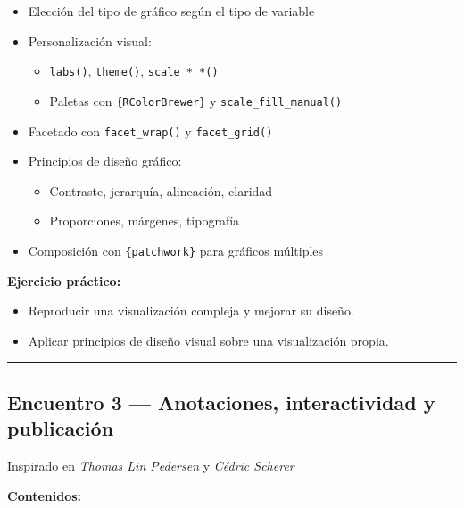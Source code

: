 \documentclass[
  11pt,
  letterpaper,
  DIV=11,
  numbers=noendperiod]{scrartcl}
\providecommand{\tightlist}{%
  \setlength{\itemsep}{0pt}\setlength{\parskip}{0pt}}\usepackage{longtable,booktabs,array}
\begin{document}
\begin{itemize}
\tightlist
\item
  Elección del tipo de gráfico según el tipo de variable
\item
  Personalización visual:

  \begin{itemize}
  \tightlist
  \item
    \texttt{labs()}, \texttt{theme()}, \texttt{scale\_*\_*()}
  \item
    Paletas con \texttt{\{RColorBrewer\}} y
    \texttt{scale\_fill\_manual()}
  \end{itemize}
\item
  Facetado con \texttt{facet\_wrap()} y \texttt{facet\_grid()}
\item
  Principios de diseño gráfico:

  \begin{itemize}
  \tightlist
  \item
    Contraste, jerarquía, alineación, claridad
  \item
    Proporciones, márgenes, tipografía
  \end{itemize}
\item
  Composición con \texttt{\{patchwork\}} para gráficos múltiples
\end{itemize}

\textbf{Ejercicio práctico:}

\begin{itemize}
\tightlist
\item
  Reproducir una visualización compleja y mejorar su diseño.
\item
  Aplicar principios de diseño visual sobre una visualización propia.
\end{itemize}

\begin{center}\rule{0.5\linewidth}{0.5pt}\end{center}

\subsection{Encuentro 3 --- Anotaciones, interactividad y
publicación}\label{encuentro-3-anotaciones-interactividad-y-publicaciuxf3n}

Inspirado en \emph{Thomas Lin Pedersen} y \emph{Cédric Scherer}

\textbf{Contenidos:}
\end{document}
